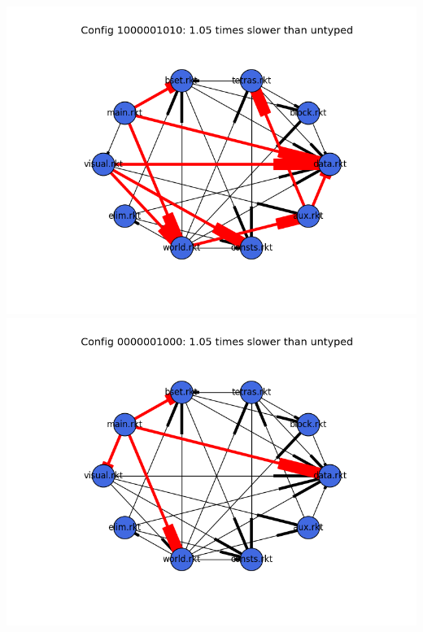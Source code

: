 \documentclass{article}
\begin{document}
\begin{itemize}
\includegraphics[width=\textwidth]{tetris-module-graph-1000001010.png}
\includegraphics[width=\textwidth]{tetris-module-graph-0000001000.png}
\end{itemize}
\end{document}
